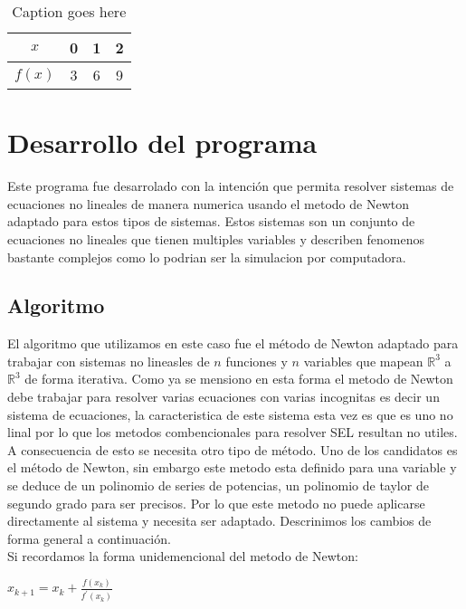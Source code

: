 \documentclass[11pt]{article}
\begin{document}
\begin{table}[H]
	\centering
		\begin{tabular}{|c|c|c|c|}\hline
		$x$ &0&1&2\\ \hline
		$f(x)$ &3&6&9\\ \hline		
		\end{tabular}
	\caption{Caption goes here}
	\label{tab:data1}
\end{table}


\section{Desarrollo del programa}
Este programa fue desarrolado con la intención que permita resolver sistemas de ecuaciones no lineales de manera numerica usando el metodo de Newton adaptado para estos tipos de sistemas. Estos sistemas son un conjunto de ecuaciones no lineales que tienen multiples variables y describen fenomenos bastante complejos como lo podrian ser la simulacion por computadora. 

\subsection{Algoritmo}
El algoritmo que utilizamos en este caso fue el  método de Newton adaptado para trabajar con sistemas no lineasles de $n$ funciones y $n$ variables que mapean $\mathbb{R}^3$ a $\mathbb{R}^3$ de forma iterativa. Como ya se mensiono en esta forma el metodo de Newton debe trabajar para resolver varias ecuaciones con varias incognitas es decir un sistema de ecuaciones, la caracteristica de este sistema esta vez es que es uno no linal por lo que los metodos combencionales para resolver SEL resultan no utiles. A consecuencia de esto se necesita otro tipo de método. Uno de los candidatos es el método de Newton, sin embargo este metodo esta definido para una variable y se deduce de un polinomio de series de potencias, un polinomio de taylor de segundo grado para ser precisos. Por lo que este metodo no puede aplicarse directamente al sistema y  necesita ser adaptado. Descrinimos los cambios de forma general a continuación.\\

Si recordamos la forma unidemencional del metodo de Newton:\\
\begin{center}
$x_{k+1} = x_{k} + \frac{f(x_{k})}{f^\prime(x_{k})} \label{eq:1}$\\
\end{center}
\end{document}
